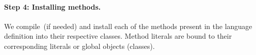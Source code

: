 


\paragraph{\textbf{Step 4: Installing methods.}}

We compile~(if needed) and install each of the methods present in the language definition into their respective classes. Method literals are bound to their corresponding literals or global objects (\eg classes).




